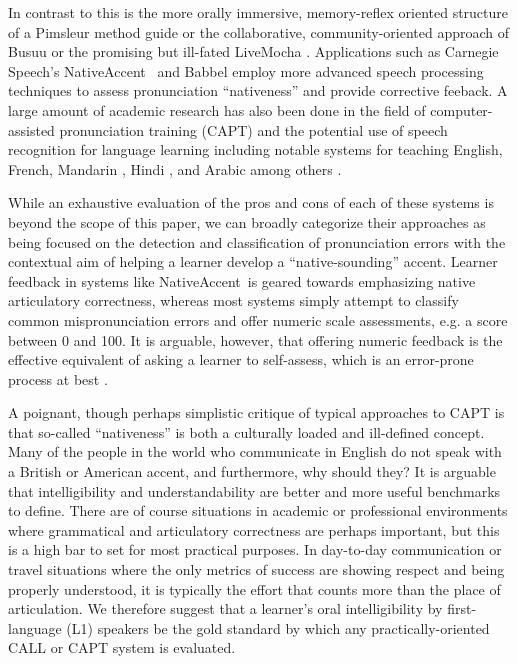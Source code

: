 In contrast to this is the more orally immersive, memory-reflex oriented structure of a Pimsleur method guide \cite{pimsleur2013learn} \cite{pimsleur1966testing} \cite{pimsleur1971psychology} \cite{godwin2010emerging} or the collaborative, community-oriented approach of Busuu \cite{pino2011busuu} \cite{ketyi2013using} or the promising but ill-fated LiveMocha \cite{jee2009livemocha} \cite{liaw2011review}. Applications such as Carnegie Speech's NativeAccent\textregistered \ \cite{eskenazi2007nativeaccenttm} and Babbel employ more advanced speech processing techniques to assess pronunciation ``nativeness'' and provide corrective feeback. A large amount of academic research has also been done in the field of computer-assisted pronunciation training (CAPT) and the potential use of speech recognition for language learning \cite{franco1997automatic} \cite{minematsu2004pronunciation} \cite{van2016evaluating} \cite{mccrocklin2016pronunciation} \cite{leepersonalized} \cite{cincarek2009automatic} \cite{kim1997automatic} \cite{wolfeapplause} including notable systems for teaching English, French, Mandarin \cite{chen2004automatic} \cite{huimproved}, Hindi \cite{patil2016detection}, and Arabic \cite{maqsood2016complete} among others \cite{cucchiarini1997automatic} \cite{bernstein1990automatic}. 

While an exhaustive evaluation of the pros and cons of each of these systems is beyond the scope of this paper, we can broadly categorize their approaches as being focused on the detection and classification of pronunciation errors with the contextual aim of helping a learner develop a ``native-sounding'' accent. Learner feedback in systems like NativeAccent\textregistered \ is geared towards emphasizing native articulatory correctness, whereas most systems simply attempt to classify common mispronunciation errors and offer numeric scale assessments, e.g. a score between 0 and 100. It is arguable, however, that offering numeric feedback is the effective equivalent of asking a learner to self-assess, which is an error-prone process at best \cite{eskenazi2007nativeaccenttm}.

A poignant, though perhaps simplistic critique of typical approaches to CAPT is that so-called ``nativeness'' is both a culturally loaded and ill-defined concept. Many of the people in the world who communicate in English do not speak with a British or American accent, and furthermore, why should they? It is arguable that intelligibility and understandability are better and more useful benchmarks to define. There are of course situations in academic or professional environments where grammatical and articulatory correctness are perhaps important, but this is a high bar to set for most practical purposes. In day-to-day communication or travel situations where the only metrics of success are showing respect and being properly understood, it is typically the effort that counts more than the place of articulation. We therefore suggest that a learner's oral intelligibility by first-language (L1) speakers be the gold standard by which any practically-oriented CALL or CAPT system is evaluated. 